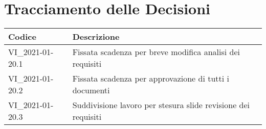 \section*{Tracciamento delle Decisioni}

\begin{center}
	\begin{longtable}{|p{3.5cm}|p{11cm}|}
		\hline
		\rowcolor{lighter-grayer}
		\textbf{Codice} & \textbf{Descrizione} \\
		\hline
		\endfirsthead

		\hline
		VI\_2021-01-20.1 & Fissata scadenza per breve modifica analisi dei requisiti \\
		VI\_2021-01-20.2 & Fissata scadenza per approvazione di tutti i documenti \\
		VI\_2021-01-20.3 & Suddivisione lavoro per stesura slide revisione dei requisiti \\
		\hline
	\end{longtable}
\end{center}